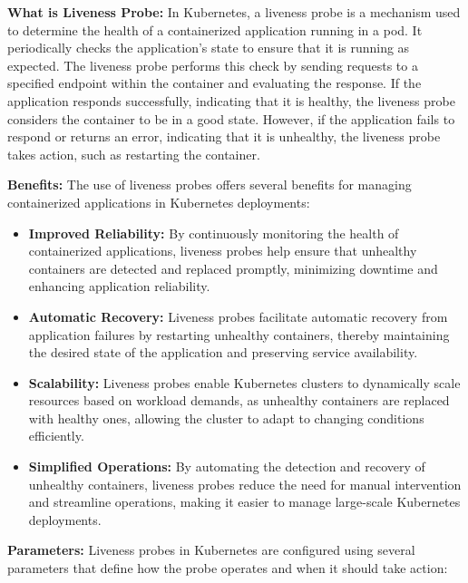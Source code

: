 \textbf{What is Liveness Probe:}
In Kubernetes, a liveness probe is a mechanism used to determine the health of a containerized application running in a pod. It periodically checks the application's state to ensure that it is running as expected. The liveness probe performs this check by sending requests to a specified endpoint within the container and evaluating the response. If the application responds successfully, indicating that it is healthy, the liveness probe considers the container to be in a good state. However, if the application fails to respond or returns an error, indicating that it is unhealthy, the liveness probe takes action, such as restarting the container. \cite{kubernetes-probes} \cite{zahorscak}

\textbf{Benefits:}
The use of liveness probes offers several benefits for managing containerized applications in Kubernetes deployments:

\begin{itemize}
    \item \textbf{Improved Reliability:} By continuously monitoring the health of containerized applications, liveness probes help ensure that unhealthy containers are detected and replaced promptly, minimizing downtime and enhancing application reliability. \cite{odabasi}
    
    \item \textbf{Automatic Recovery:} Liveness probes facilitate automatic recovery from application failures by restarting unhealthy containers, thereby maintaining the desired state of the application and preserving service availability. \cite{kubernetes-probes}
    
    \item \textbf{Scalability:} Liveness probes enable Kubernetes clusters to dynamically scale resources based on workload demands, as unhealthy containers are replaced with healthy ones, allowing the cluster to adapt to changing conditions efficiently. \cite{zahorscak}
    
    \item \textbf{Simplified Operations:} By automating the detection and recovery of unhealthy containers, liveness probes reduce the need for manual intervention and streamline operations, making it easier to manage large-scale Kubernetes deployments. \cite{zahorscak}
\end{itemize}

\textbf{Parameters:}
Liveness probes in Kubernetes are configured using several parameters that define how the probe operates and when it should take action:


